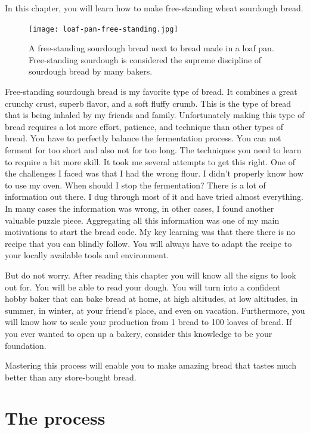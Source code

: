 In this chapter, you will learn how to make
free-standing wheat sourdough bread.

\begin{figure}[!htb]
  \texttt{[image: loaf-pan-free-standing.jpg]}
  \caption{A free-standing sourdough bread next to bread made in a loaf pan.
  Free-standing sourdough is considered the supreme discipline of sourdough bread by many bakers.
  }
\end{figure}

Free-standing sourdough bread is my favorite
type of bread. It combines a great crunchy crust, superb
flavor, and a soft fluffy crumb. This is the type of bread
that is being inhaled by my friends and family. Unfortunately
making this type of bread requires a lot more effort, patience,
and technique than other types of bread. You have to perfectly
balance the fermentation process. You can not ferment for too
short and also not for too long. The techniques you need to
learn to require a bit more skill. It took me several attempts
to get this right. One of the challenges I faced was that
I had the wrong flour. I didn't properly know how to use my oven.
When should I stop the fermentation? There is a lot of information
out there. I dug through most of it and have tried almost everything.
In many cases the information was wrong, in other cases, I
found another valuable puzzle piece. Aggregating all this
information was one of my main motivations to start the bread code.
My key learning was that there there is no recipe that
you can blindly follow. You will always have to adapt the recipe
to your locally available tools and environment.

But do not worry. After reading this chapter you will know
all the signs to look out for. You will be able to read your dough.
You will turn into a confident hobby baker that can bake bread
at home, at high altitudes, at low altitudes, in summer, in winter,
at your friend's place, and even on vacation. Furthermore,
you will know how to scale your production from 1 bread to 100 loaves of bread.
If you ever wanted to open up a bakery, consider this knowledge to
be your foundation.

Mastering this process will enable you to make amazing bread
that tastes much better than any store-bought bread.

\section{The process}

